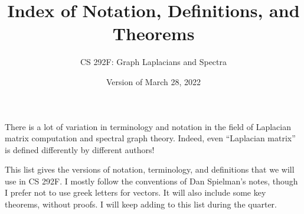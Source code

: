 \documentclass[11pt]{article}
\begin{document}
\title{Index of Notation, Definitions, and Theorems}
\author{CS 292F: Graph Laplacians and Spectra}
\date{Version of March 28, 2022}
\maketitle

There is a lot of variation in terminology and notation in
the field of Laplacian matrix computation and spectral graph 
theory.  
Indeed, even ``Laplacian matrix'' is defined differently by
different authors!

This list gives the versions of notation, terminology, and definitions 
that we will use in CS 292F.
I mostly follow the conventions of Dan Spielman's notes, 
though I prefer not to use greek letters for vectors.
It will also include some key theorems, without proofs.
I will keep adding to this list during the quarter.
\end{document}
